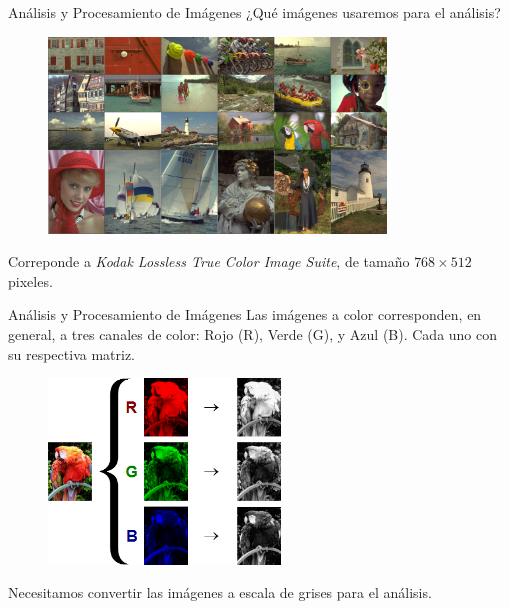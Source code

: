 \documentclass{beamer}
\begin{document}
\begin{frame}{Análisis y Procesamiento de Imágenes}
    ¿Qué imágenes usaremos para el análisis? 
    \pause
    \begin{figure}[H]
        \centering
        \includegraphics[width=0.8\textwidth]{all_images_grid.png}
    \end{figure}      
    Correponde a \textit {Kodak Lossless True Color Image Suite}, de tamaño $768 \times 512$ pixeles.
\end{frame}

\begin{frame}{Análisis y Procesamiento de Imágenes}
    Las imágenes a color corresponden, en general, a tres canales de color: Rojo (R), Verde (G), y Azul (B). Cada uno con su respectiva matriz.
    \pause
    \begin{figure}[H]
        \centering
        \includegraphics[width=0.55\textwidth]{RGB_channels_separation.png}
    \end{figure} 
    \pause
    Necesitamos convertir las imágenes a escala de grises para el análisis.
\end{frame}
\end{document}
